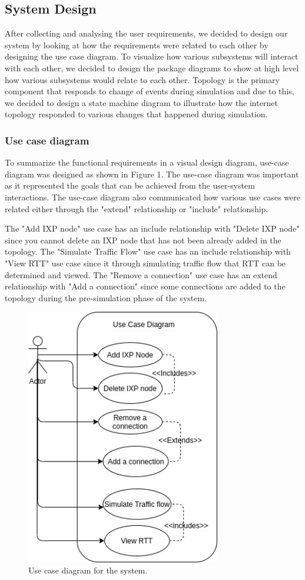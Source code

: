 \subsection{System Design}
After collecting and analysing the user requirements, we decided to design our system by looking at how the requirements were related to each other by designing the use case diagram. To visualize how various subsystems will interact with each other, we decided to design the package diagrams to show at high level how various subsystems would relate to each other. Topology is the primary component that responds to change of events during simulation and due to this, we decided to design a state machine diagram to illustrate how the internet topology responded to various changes that happened during simulation. 
\subsubsection{Use case diagram}
To summarize the functional requirements in a visual design diagram, use-case diagram was designed as shown in Figure 1. The use-case diagram was important as it represented the goals that can be achieved from the user-system interactions. The use-case diagram also communicated how various use cases were related either through the "extend" relationship or "include" relationship.

The "Add IXP node" use case has an include relationship with "Delete IXP node" since you cannot delete an IXP node that has not been already added in the topology. The "Simulate Traffic Flow" use case has an include relationship with "View RTT" use case since it through simulating traffic flow that RTT can be determined and viewed. The "Remove a connection" use case has an extend relationship with "Add a connection" since some connections are added to the topology during the pre-simulation phase of the system.

\begin{figure}[htp]
   \centering
     \includegraphics[width=8.5cm]{sections/pictures-diagrams/usecasedigarma.jpg}
   \caption{Use case diagram for the system.}
    \label{figure:galaxy}
\end{figure}


